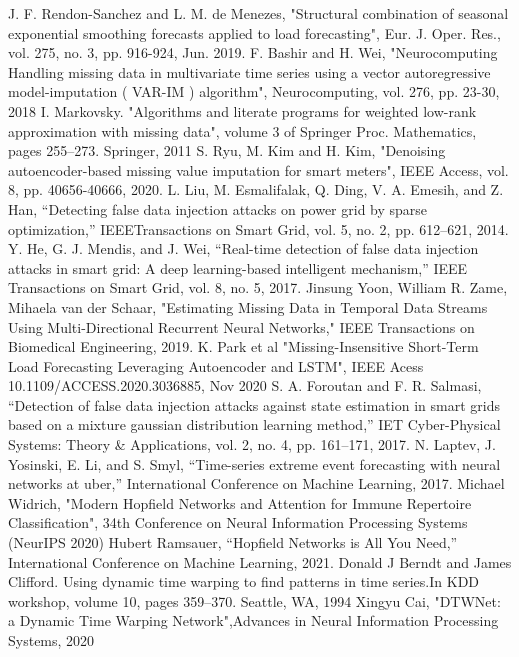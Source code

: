 \documentclass[conference]{IEEEtran}
\begin{document}
\begin{thebibliography}{00}
 J. F. Rendon-Sanchez and L. M. de Menezes, "Structural combination of seasonal exponential smoothing forecasts applied to load forecasting", Eur. J. Oper. Res., vol. 275, no. 3, pp. 916-924, Jun. 2019.
 F. Bashir and H. Wei, "Neurocomputing Handling missing data in multivariate time series using a vector autoregressive model-imputation ( VAR-IM ) algorithm", Neurocomputing, vol. 276, pp. 23-30, 2018
 I. Markovsky. "Algorithms and literate programs for weighted low-rank approximation with missing data", volume 3 of Springer Proc. Mathematics, pages 255–273. Springer, 2011
 S. Ryu, M. Kim and H. Kim, "Denoising autoencoder-based missing value imputation for smart meters", IEEE Access, vol. 8, pp. 40656-40666, 2020.
  L. Liu, M. Esmalifalak, Q. Ding, V. A. Emesih, and Z. Han, “Detecting false data injection attacks on power grid by sparse optimization,” IEEETransactions on Smart Grid, vol. 5, no. 2, pp. 612–621, 2014.
 Y. He, G. J. Mendis, and J. Wei, “Real-time detection of false data injection attacks in smart grid: A deep learning-based intelligent mechanism,” IEEE Transactions on Smart Grid, vol. 8, no. 5, 2017.
 Jinsung Yoon, William R. Zame, Mihaela van der Schaar, "Estimating Missing Data in Temporal Data Streams Using Multi-Directional Recurrent Neural Networks," IEEE Transactions on Biomedical Engineering, 2019.
 K. Park et al "Missing-Insensitive Short-Term Load Forecasting Leveraging Autoencoder and LSTM", IEEE Acess 10.1109/ACCESS.2020.3036885, Nov 2020
 S. A. Foroutan and F. R. Salmasi, “Detection of false data injection attacks against state estimation in smart grids based on a mixture gaussian distribution learning method,” IET Cyber-Physical Systems: Theory \& Applications, vol. 2, no. 4, pp. 161–171, 2017.
  N. Laptev, J. Yosinski, E. Li, and S. Smyl, “Time-series extreme event forecasting with neural networks at uber,” International Conference on Machine Learning, 2017.
Michael Widrich, "Modern Hopfield Networks and Attention for Immune Repertoire Classification", 34th Conference on Neural Information Processing Systems (NeurIPS 2020)
  Hubert Ramsauer, “Hopfield Networks is All You Need,” International Conference on Machine Learning, 2021.
 Donald J Berndt and James Clifford. Using dynamic time warping to find patterns in time series.In KDD workshop, volume 10, pages 359–370. Seattle, WA, 1994
 Xingyu Cai, "DTWNet: a Dynamic Time Warping Network",Advances in Neural Information Processing Systems, 2020

\end{thebibliography}
\end{document}
